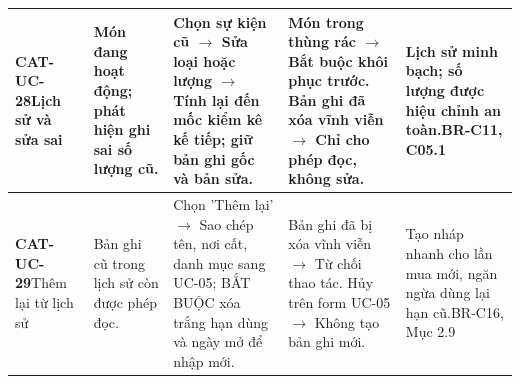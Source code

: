 \documentclass[10pt,a4paper]{article}
\begin{document}
\begin{longtable}{|p{2.1cm}|p{2.3cm}|p{3.5cm}|p{3.8cm}|p{3.0cm}|}
\hline
\textbf{CAT-UC-28}\newline Lịch sử và sửa sai & Món đang hoạt động; phát hiện ghi sai số lượng cũ. & Chọn sự kiện cũ $\to$ Sửa loại hoặc lượng $\to$ Tính lại đến mốc kiểm kê kế tiếp; giữ bản ghi gốc và bản sửa. & Món trong thùng rác $\to$ Bắt buộc khôi phục trước. Bản ghi đã xóa vĩnh viễn $\to$ Chỉ cho phép đọc, không sửa. & Lịch sử minh bạch; số lượng được hiệu chỉnh an toàn.\newline BR-C11, C05.1 \\
\hline
\textbf{CAT-UC-29}\newline Thêm lại từ lịch sử & Bản ghi cũ trong lịch sử còn được phép đọc. & Chọn 'Thêm lại' $\to$ Sao chép tên, nơi cất, danh mục sang UC-05; BẮT BUỘC xóa trắng hạn dùng và ngày mở để nhập mới. & Bản ghi đã bị xóa vĩnh viễn $\to$ Từ chối thao tác. Hủy trên form UC-05 $\to$ Không tạo bản ghi mới. & Tạo nháp nhanh cho lần mua mới, ngăn ngừa dùng lại hạn cũ.\newline BR-C16, Mục 2.9 \\
\hline


\end{longtable}
\end{document}
